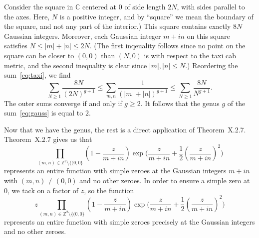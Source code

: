 \documentclass[11pt]{book}
\theoremstyle{definition}
\begin{document}
\begin{enumerate}
    Consider the square in $\mathbb C$ centered at $0$ of side length $2N$, with sides parallel to the axes. Here, $N$ is a positive integer, and by ``square'' we mean the boundary of the square, and not any part of the interior.)  This square contains exactly $8N$ Gaussian integers.  Moreover, each Gaussian integer $m+in$ on this square satisfies $N \leq |m| + |n| \leq 2N$.  (The first inqeuality follows since no point on the square can be closer to $(0,0)$ than $(N,0)$ is with respect to the taxi cab metric, and the second inequality is clear since $|m|, |n| \leq N$.)   Reordering the sum~\eqref{eq:taxi}, we find
    \[ 
      \sum_{N\geq 1} \frac{8N}{(2N)^{g+1}} \leq \sum_{m,n} \frac{1}{(|m| + |n|)^{g+1}}  \leq \sum_{N\geq 1} \frac{8N}{N^{g+1}}. \]  The outer sums converge if and only if $g\geq 2$.  It follows that the genus $g$ of the sum~\eqref{eq:gauss} is equal to $2$. 

      Now that we have the genus, the rest is a direct application of Theorem~X.2.7. Theorem~X.2.7 gives us that 
      \[ \prod_{(m,n) \in \mathbb Z^2 \setminus \{ (0,0\} } \left( 1 - \frac{z}{m+in} \right) \exp \big( \frac{z}{m+in} + \frac{1}{2} \left(\frac{z}{m+in}\right)^2 \big) \] represents an entire function with simple zeroes at the Gaussian integers $m+in$ with $(m,n) \neq (0,0)$ and no other zeroes.  In order to ensure a simple zero at $0$, we tack on a factor of $z$, so the function
      \[ z \prod_{(m,n) \in \mathbb Z^2 \setminus \{ (0,0\} } \left( 1 - \frac{z}{m+in} \right) \exp \big( \frac{z}{m+in} + \frac{1}{2} \left(\frac{z}{m+in}\right)^2 \big) \] represents an entire function with simple zeroes precisely at the Gaussian integers and no other zeroes. 
\end{enumerate}
\end{document}
